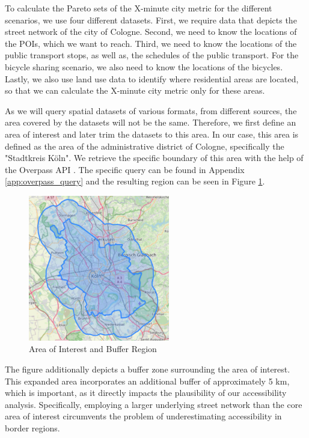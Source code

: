 To calculate the Pareto sets of the X-minute city metric for the different scenarios, we use four different datasets.
First, we require data that depicts the street network of the city of Cologne.
Second, we need to know the locations of the POIs, which we want to reach.
Third, we need to know the locations of the public transport stops, as well as, the schedules of the public transport.
For the bicycle sharing scenario, we also need to know the locations of the bicycles.
Lastly, we also use land use data to identify where residential areas are located, so that we can calculate the X-minute city metric only for these areas.

As we will query spatial datasets of various formats, from different sources, the area covered by the datasets will not be the same.
Therefore, we first define an area of interest and later trim the datasets to this area.
In our case, this area is defined as the area of the administrative district of Cologne, specifically the "Stadtkreis Köln".
We retrieve the specific boundary of this area with the help of the Overpass API .
The specific query can be found in Appendix \ref{app:overpass_query} and the resulting region can be seen in Figure \ref{fig:area_plus_buffer}.

\begin{figure}
  \begin{center}
    \includegraphics[width=0.55\textwidth]{Figures/experiment/area_plus_buffer.png}
  \end{center}
  \caption{Area of Interest and Buffer Region}\label{fig:area_plus_buffer}
\end{figure}


The figure additionally depicts a buffer zone surrounding the area of interest.
This expanded area incorporates an additional buffer of approximately 5 km, which is important, as it directly impacts the plausibility of our accessibility analysis.
Specifically, employing a larger underlying street network than the core area of interest circumvents the problem of underestimating accessibility in border regions.

